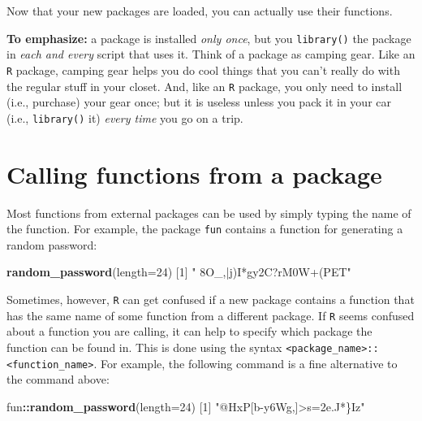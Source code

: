 \documentclass[
]{book}
\newenvironment{Shaded}{\begin{snugshade}}{\end{snugshade}}
\newcommand{\DataTypeTok}[1]{\textcolor[rgb]{0.13,0.29,0.53}{#1}}
\newcommand{\DecValTok}[1]{\textcolor[rgb]{0.00,0.00,0.81}{#1}}
\newcommand{\KeywordTok}[1]{\textcolor[rgb]{0.13,0.29,0.53}{\textbf{#1}}}
\newcommand{\NormalTok}[1]{#1}
\newcommand{\OperatorTok}[1]{\textcolor[rgb]{0.81,0.36,0.00}{\textbf{#1}}}
\newcommand{\StringTok}[1]{\textcolor[rgb]{0.31,0.60,0.02}{#1}}
\begin{document}
Now that your new packages are loaded, you can actually use their functions.

\textbf{To emphasize:} a package is installed \emph{only once}, but you \texttt{library()} the package in \emph{each and every} script that uses it. Think of a package as camping gear. Like an \texttt{R} package, camping gear helps you do cool things that you can't really do with the regular stuff in your closet. And, like an \texttt{R} package, you only need to install (i.e., purchase) your gear once; but it is useless unless you pack it in your car (i.e., \texttt{library()} it) \emph{every time} you go on a trip.

\hypertarget{calling-functions-from-a-package}{%
\section*{Calling functions from a package}\label{calling-functions-from-a-package}}

Most functions from external packages can be used by simply typing the name of the function. For example, the package \texttt{fun} contains a function for generating a random password:

\begin{Shaded}
\begin{Highlighting}[]
\KeywordTok{random_password}\NormalTok{(}\DataTypeTok{length=}\DecValTok{24}\NormalTok{)}
\NormalTok{[}\DecValTok{1}\NormalTok{] }\StringTok{" 8O_,|j)I*gy2C?rM0W+(PET"}
\end{Highlighting}
\end{Shaded}

Sometimes, however, \texttt{R} can get confused if a new package contains a function that has the same name of some function from a different package. If \texttt{R} seems confused about a function you are calling, it can help to specify which package the function can be found in. This is done using the syntax \texttt{\textless{}package\_name\textgreater{}::\textless{}function\_name\textgreater{}}. For example, the following command is a fine alternative to the command above:

\begin{Shaded}
\begin{Highlighting}[]
\NormalTok{fun}\OperatorTok{::}\KeywordTok{random_password}\NormalTok{(}\DataTypeTok{length=}\DecValTok{24}\NormalTok{)}
\NormalTok{[}\DecValTok{1}\NormalTok{] }\StringTok{"@HxP[b-y6Wg,]>s=2e.J*\}Iz"}
\end{Highlighting}
\end{Shaded}
\end{document}
